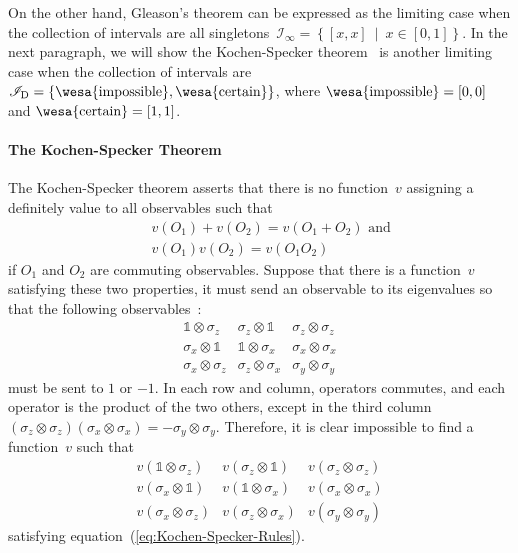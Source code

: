 \documentclass[english,reprint, aps, prl,superscriptaddress, showpacs,
showkeys]{revtex4-1}
\theoremstyle{plain}
\theoremstyle{definition}
\newcommand{\imposs}{{\mbox{\wesa{impossible}}}}
\newcommand{\necess}{{\mbox{\wesa{certain}}}}
\newcommand{\set}[2]{\ensuremath{\left\{ {#1}~\middle|~{#2}\right\} }}
\begin{document}
On the other hand, Gleason's theorem can be expressed as the limiting
case when the collection of intervals are all singletons~$\mathscr{I}_{\infty}=\set{\left[x,x\right]}{x\in\left[0,1\right]}$.
In the next paragraph, we will show the Kochen-Specker theorem~\citep{kochenspecker1967,peres1995quantum,Redhead1987-REDINA}
is another limiting case when the collection of intervals are $\mathscr{I}_{\mathrm{D}}=\left\{ \imposs,\necess\right\} $,
where $\imposs=\left[0,0\right]$ and $\necess=\left[1,1\right]$.

\paragraph{The Kochen-Specker Theorem}

The Kochen-Specker theorem asserts that there is no function~$v$
assigning a definitely value to all observables such that \begin{subequations}
\label{eq:Kochen-Specker-Rules} 
\begin{eqnarray}
 &  & v\left(O_{1}\right)+v\left(O_{2}\right)=v\left(O_{1}+O_{2}\right)\textrm{ and}\\
 &  & v\left(O_{1}\right)v\left(O_{2}\right)=v\left(O_{1}O_{2}\right)
\end{eqnarray}
\end{subequations} if $O_{1}$ and $O_{2}$ are commuting observables.
Suppose that there is a function~$v$ satisfying these two properties,
it must send an observable to its eigenvalues so that the following
observables~\citep{Mermin1990Simple,peres1995quantum}: 
\begin{equation}
\begin{array}{ccc}
\mathbb{1}\otimes\sigma_{z} & \sigma_{z}\otimes\mathbb{1} & \sigma_{z}\otimes\sigma_{z}\\
\sigma_{x}\otimes\mathbb{1} & \mathbb{1}\otimes\sigma_{x} & \sigma_{x}\otimes\sigma_{x}\\
\sigma_{x}\otimes\sigma_{z} & \sigma_{z}\otimes\sigma_{x} & \sigma_{y}\otimes\sigma_{y}
\end{array}\label{eq:MerminSquare}
\end{equation}
must be sent to $1$ or $-1$. In each row and column, operators commutes,
and each operator is the product of the two others, except in the
third column $\left(\sigma_{z}\otimes\sigma_{z}\right)\left(\sigma_{x}\otimes\sigma_{x}\right)=-\sigma_{y}\otimes\sigma_{y}$.
Therefore, it is clear impossible to find a function~$v$ such that
\begin{equation}
\begin{array}{ccc}
v\left(\mathbb{1}\otimes\sigma_{z}\right) & v\left(\sigma_{z}\otimes\mathbb{1}\right) & v\left(\sigma_{z}\otimes\sigma_{z}\right)\\
v\left(\sigma_{x}\otimes\mathbb{1}\right) & v\left(\mathbb{1}\otimes\sigma_{x}\right) & v\left(\sigma_{x}\otimes\sigma_{x}\right)\\
v\left(\sigma_{x}\otimes\sigma_{z}\right) & v\left(\sigma_{z}\otimes\sigma_{x}\right) & v\left(\sigma_{y}\otimes\sigma_{y}\right)
\end{array}\label{eq:MerminSquare-values}
\end{equation}
satisfying equation~(\ref{eq:Kochen-Specker-Rules}).
\end{document}
